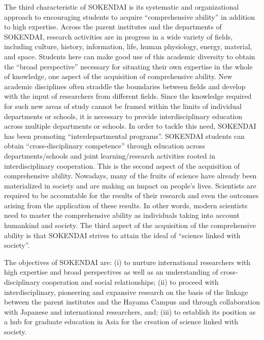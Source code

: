 The third characteristic of SOKENDAI is its systematic and organizational approach to encouraging students to acquire ``comprehensive ability'' in addition to high expertise. Across the parent institutes and the departments of SOKENDAI, research activities are in progress in a wide variety of fields, including culture, history, information, life, human physiology, energy, material, and space. Students here can make good use of this academic diversity to obtain the ``broad perspective'' necessary for situating their own expertise in the whole of knowledge, one aspect of the acquisition of comprehensive ability. New academic disciplines often straddle the boundaries between fields and develop with the input of researchers from different fields. Since the knowledge required for such new areas of study cannot be framed within the limits of individual departments or schools, it is necessary to provide interdisciplinary education across multiple departments or schools. In order to tackle this need, SOKENDAI has been promoting ``interdepartmental programs''. SOKENDAI students can obtain ``cross-disciplinary competence'' through education across departments/schools and joint learning/research activities rooted in interdisciplinary cooperation. This is the second aspect of the acquisition of comprehensive ability. Nowadays, many of the fruits of science have already been materialized in society and are making an impact on people's lives. Scientists are required to be accountable for the results of their research and even the outcomes arising from the application of these results. In other words, modern scientists need to master the comprehensive ability as individuals taking into account humankind and society. The third aspect of the acquisition of the comprehensive ability is that SOKENDAI strives to attain the ideal of ``science linked with society''.

The objectives of SOKENDAI are: (i) to nurture international researchers with high expertise and broad perspectives as well as an understanding of cross-disciplinary cooperation and social relationships; (ii) to proceed with interdisciplinary, pioneering and expansive research on the basis of the linkage between the parent institutes and the Hayama Campus and through collaboration with Japanese and international researchers, and; (iii) to establish its position as a hub for graduate education in Asia for the creation of science linked with society.

